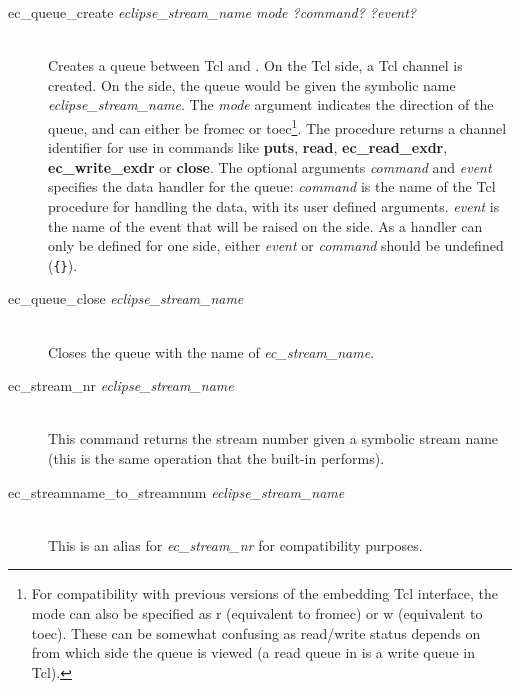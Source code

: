 \begin{description}
\item[ec_queue_create {\it
eclipse_stream_name mode ?command? ?event?}]\ \\
        Creates a queue between Tcl and {\eclipse}. On
        the Tcl side, a Tcl channel is created. On the {\eclipse} side, the 
        queue would be given the symbolic name {\it eclipse_stream_name}. 
        The {\it mode} argument indicates the direction of the queue, and
        can either be fromec or toec\footnote{For compatibility with previous
        versions of the embedding Tcl interface, the mode can also be
        specified as r (equivalent to fromec) or w (equivalent to
        toec). These can be somewhat confusing as read/write status depends
        on from which side the queue is viewed (a read queue in {\eclipse} is a
        write queue in Tcl).}.
        The procedure returns a channel identifier for use in commands
        like {\bf puts}, {\bf read}, {\bf ec_read_exdr},
        {\bf ec_write_exdr} or {\bf close}. The optional arguments {\it
        command\/} and {\it event\/} specifies the data handler for the
        queue: {\it command\/} is the name
        of the Tcl
        procedure for handling the data, with its user defined arguments. 
        {\it event} is the name of the event that will be
        raised on the {\eclipse} side.
        As a handler can only be defined for one side,
        either {\it event\/} or {\it command\/} should be undefined
        (\verb'{}'). 

\item[ec_queue_close {\it
eclipse_stream_name}]\ \\
	Closes the queue with the {\eclipse} name of {\it
	ec_stream_name}. 

\item[ec_stream_nr {\it eclipse_stream_name}]\ \\
        This command returns the {\eclipse} stream number given a
        symbolic stream name (this is the same operation that the
        {\eclipse} built-in
        performs). 

\item[ec_streamname_to_streamnum {\it eclipse_stream_name}]\ \\
	This is an alias for {\it ec_stream_nr} for compatibility purposes.


\end{description}
